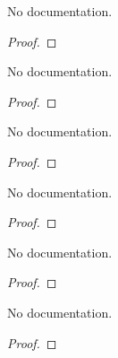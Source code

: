 \begin{lemma}\label{Vert_div}
        \leanok
                No documentation.
    \end{lemma}

\begin{proof}
    \leanok
\end{proof}

\begin{lemma}\label{Simplifying₁}
        \leanok
                No documentation.
    \end{lemma}

\begin{proof}
    \leanok
\end{proof}

\begin{lemma}\label{Simplifying₂}
        \leanok
                No documentation.
    \end{lemma}

\begin{proof}
    \leanok
\end{proof}

\begin{lemma}\label{div_div_mul}
        \leanok
                No documentation.
    \end{lemma}

\begin{proof}
    \leanok
\end{proof}

\begin{theorem}\label{HasGradientAt.one_div}
        \leanok
                No documentation.
    \end{theorem}

\begin{proof}
    \leanok
\end{proof}

\begin{theorem}\label{HasGradientAtFilter.comp
}
        \leanok
                No documentation.
    \end{theorem}

\begin{proof}
    \leanok
\end{proof}

